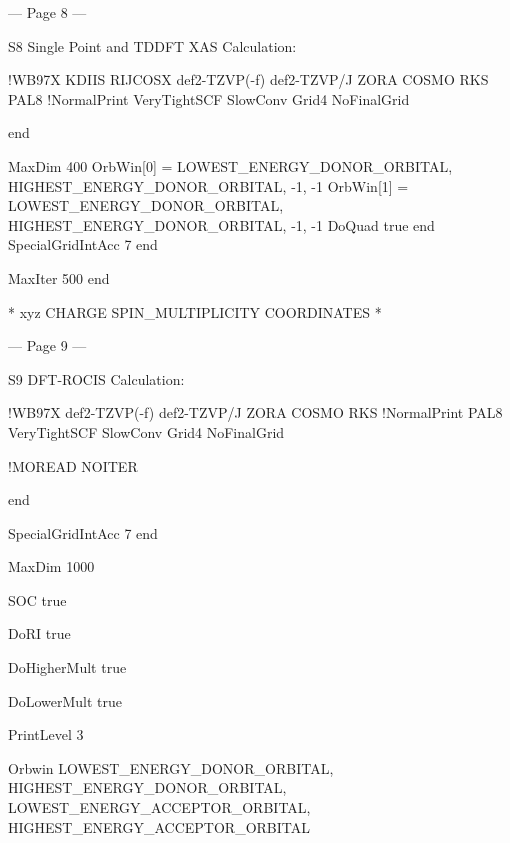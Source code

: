  
 


--- Page 8 ---
 
S8 
Single Point and TDDFT XAS Calculation: 
 
!WB97X KDIIS RIJCOSX def2-TZVP(-f) def2-TZVP/J ZORA COSMO RKS PAL8 
!NormalPrint VeryTightSCF SlowConv Grid4 NoFinalGrid 
 
 
 end 
 
 MaxDim 400 
 OrbWin[0] = LOWEST_ENERGY_DONOR_ORBITAL, 
HIGHEST_ENERGY_DONOR_ORBITAL, -1, -1 
 OrbWin[1] = LOWEST_ENERGY_DONOR_ORBITAL, 
HIGHEST_ENERGY_DONOR_ORBITAL, -1, -1 
 DoQuad true 
 end 
        SpecialGridIntAcc 7 
        end 
 
 
    MaxIter 500 
    end 
 
* xyz CHARGE SPIN_MULTIPLICITY 
COORDINATES 
* 
 
 
 
 
 
 
 
 
 
 
 
 
 


--- Page 9 ---
 
S9 
DFT-ROCIS Calculation: 
 
!WB97X def2-TZVP(-f) def2-TZVP/J ZORA COSMO RKS 
!NormalPrint PAL8 VeryTightSCF SlowConv Grid4 NoFinalGrid 
 
!MOREAD NOITER 
 
 
 end 
 
        SpecialGridIntAcc 7 
        end 
 
 
 
MaxDim 1000 
 
SOC true 
 
DoRI true 
 
DoHigherMult true 
 
DoLowerMult true 
 
PrintLevel 3 
 
Orbwin LOWEST_ENERGY_DONOR_ORBITAL, 
HIGHEST_ENERGY_DONOR_ORBITAL, LOWEST_ENERGY_ACCEPTOR_ORBITAL, 
HIGHEST_ENERGY_ACCEPTOR_ORBITAL  
 
